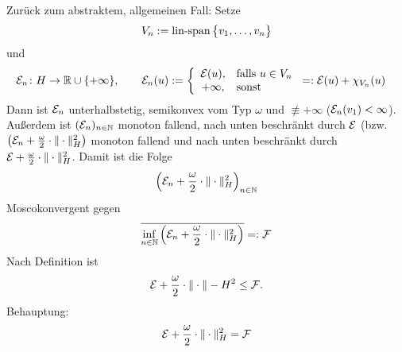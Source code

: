 Zurück zum abstraktem, allgemeinen Fall:
Setze
\begin{align*}
	V_n:=\operatorname{lin-span}\big\lbrace v_1,\ldots,v_n\big\rbrace
\end{align*}
und
\begin{align*}
	\mathcal{E}_n&\colon H\to\mathbb{R}\cup\lbrace+\infty\rbrace,\qquad
	\mathcal{E}_n(u):=\left\lbrace\begin{array}{cl}
		\mathcal{E}(u) ,&\text{falls } u\in V_n\\
		+\infty, &\text{sonst }
	\end{array}\right.
	=:\mathcal{E}(u)+\chi_{V_n}(u)
\end{align*}
Dann ist $\mathcal{E}_n$ unterhalbstetig, semikonvex vom Typ $\omega$ und $\not\equiv+\infty$ ($\mathcal{E}_n(v_1)<\infty$).
Außerdem ist $(\mathcal{E}_n)_{n\in\mathbb{N}}$ monoton fallend, nach unten beschränkt durch $\mathcal{E}$ 
(bzw. $\left(\mathcal{E}_n+\frac{\omega}{2}\cdot\Vert\cdot\Vert_H^2\right)$ monoton fallend und nach unten beschränkt durch $\mathcal{E}+\frac{\omega}{2}\cdot\Vert\cdot\Vert_H^2$.
Damit ist die Folge
\begin{align*}
	\left(\mathcal{E}_n+\frac{\omega}{2}\cdot\Vert\cdot\Vert_H^2\right)_{n\in\mathbb{N}}
\end{align*}
Moscokonvergent gegen 
\begin{align*}
	\overline{\inf\limits_{n\in\mathbb{N}}\left(\mathcal{E}_n+\frac{\omega}{2}\cdot\Vert\cdot\Vert_H^2\right)}=:\mathcal{F}
\end{align*}
Nach Definition ist 
\begin{align*}
	\mathcal{E}+\frac{\omega}{2}\cdot\Vert\cdot\Vert-H^2\leq \mathcal{F}.
\end{align*}
Behauptung:
\begin{align*}
	\mathcal{E}+\frac{\omega}{2}\cdot\Vert\cdot\Vert_H^2=\mathcal{F}
\end{align*}

